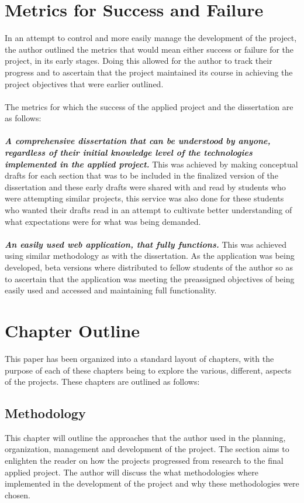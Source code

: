 \section{Metrics for Success and Failure}
In an attempt to control and more easily manage the development of the project, the author outlined the metrics that would mean either success or failure for the project, in its early stages. Doing this allowed for the author to track their progress and to ascertain that the project maintained its course in achieving the project objectives that were earlier outlined. \\ \\
The metrics for which the success of the applied project and the dissertation are as follows: \\ \\
\textbf{\emph{A comprehensive dissertation that can be understood by anyone,  regardless of their initial knowledge level of the technologies implemented in the applied project.}} This was achieved by making conceptual drafts for each section that was to be included in the finalized version of the dissertation and these early drafts were shared with and read by students who were attempting similar projects, this service was also done for these students who wanted their drafts read in an attempt to cultivate better understanding of what expectations were for what was being demanded.\\ \\
\textbf{\emph{An easily used web application, that fully functions.}} This was achieved using similar methodology as with the dissertation. As the application was being developed, beta versions where distributed to fellow students of the author so as to ascertain that the application was meeting the preassigned objectives of being easily used and accessed and maintaining full functionality. 

\section{Chapter Outline} 
This paper has been organized into a standard layout of chapters, with the purpose of each of these chapters being to explore the various, different, aspects of the projects. 
These chapters are outlined as follows: 
\subsection{Methodology}
This chapter will outline the approaches that the author used in the planning, organization, management and development of the project. The section aims to enlighten the reader on how the projects progressed from research to the final applied project. The author will discuss the what methodologies where implemented in the development of the project and why these methodologies were chosen. 
